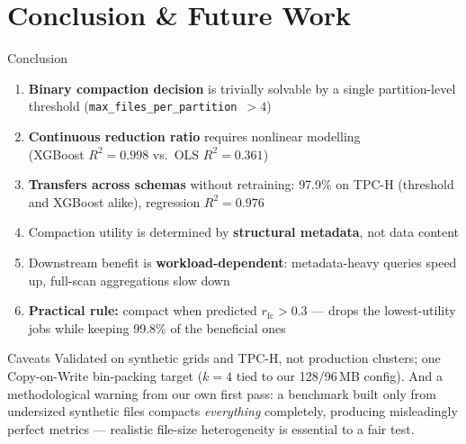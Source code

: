 \documentclass[aspectratio=169, 10pt]{beamer}
\begin{document}
\section{Conclusion \& Future Work}

\begin{frame}{Conclusion}
\begin{enumerate}\small
  \item \textbf{Binary compaction decision} is trivially solvable
        by a single partition-level threshold
        (\texttt{max\_files\_per\_partition}~$>4$)
  \item \textbf{Continuous reduction ratio} requires nonlinear modelling\\
        (XGBoost \alert{$R^2 = 0.998$} vs.\ OLS $R^2 = 0.361$)
  \item \textbf{Transfers across schemas} without retraining:
        \alert{97.9\%} on TPC-H (threshold and XGBoost alike),
        regression \alert{$R^2 = 0.976$}
  \item Compaction utility is determined by \textbf{structural metadata},
        not data content
  \item Downstream benefit is \textbf{workload-dependent}: metadata-heavy
        queries speed up, full-scan aggregations slow down
  \item \textbf{Practical rule:} compact when predicted
        $r_{\mathrm{fc}} > 0.3$ --- drops the lowest-utility jobs while
        keeping \alert{99.8\%} of the beneficial ones
\end{enumerate}

\vspace{0.6em}
\begin{block}{\; Caveats}
\small Validated on synthetic grids and TPC-H, not production clusters;
one Copy-on-Write bin-packing target ($k{=}4$ tied to our 128/96\,MB
config). And a methodological warning from our own first pass: a benchmark
built only from undersized synthetic files compacts \emph{everything}
completely, producing misleadingly perfect metrics --- realistic file-size
heterogeneity is essential to a fair test.
\end{block}
\end{frame}

\end{document}
